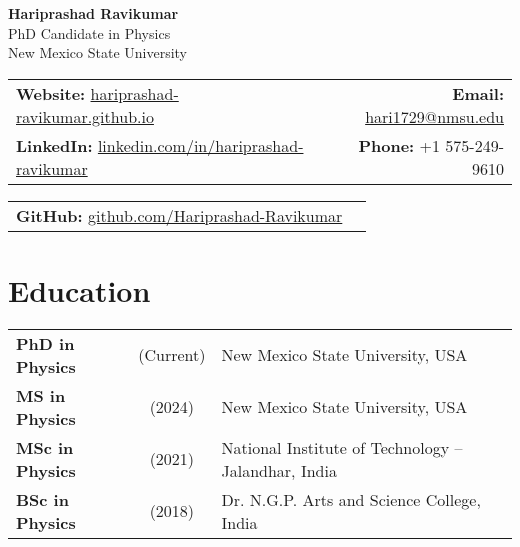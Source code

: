 \documentclass[11pt]{article}
\begin{document}
\begin{center}
    \textbf{\Huge Hariprashad Ravikumar} \\
    \vspace{0.5em}
    PhD Candidate in Physics\\
    New Mexico State University \\
\end{center}

\begin{tabularx}{\textwidth}{@{}Xr@{}}
    \textbf{Website:} \href{https://hariprashad-ravikumar.github.io}{hariprashad-ravikumar.github.io} & \textbf{Email:} \href{mailto:hari1729@nmsu.edu}{hari1729@nmsu.edu}  \\
    \textbf{LinkedIn:} \href{https://www.linkedin.com/in/hariprashad-ravikumar}{linkedin.com/in/hariprashad-ravikumar} & \textbf{Phone:} +1 575-249-9610 
\end{tabularx}
\vspace{-1em}
\begin{tabularx}{\textwidth}{@{}Xr@{}}
\textbf{GitHub:} \href{https://github.com/Hariprashad-Ravikumar}{github.com/Hariprashad-Ravikumar}  \\
\end{tabularx}

\vspace{0.5em}
\section*{Education}
\vspace{-0.7em}
\begin{tabularx}{\textwidth}{@{}lcX@{}}
    \textbf{PhD in Physics} & (Current) & New Mexico State University, USA \\
    \textbf{MS in Physics} & (2024) & New Mexico State University, USA \\
    \textbf{MSc in Physics} & (2021) & National Institute of Technology – Jalandhar, India \\
    \textbf{BSc in Physics} & (2018) &  Dr. N.G.P. Arts and Science College, India
\end{tabularx}
\end{document}
